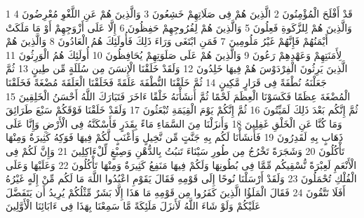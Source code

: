 \documentclass[20pt,a4paper]{article}
\title{}
\author{}
\date{}
\begin{document}
\pagecolor{cl_page}



{\tiny\colorbox{cl_aya}{1}} قَدْ أَفْلَحَ الْمُؤْمِنُونَ
{\tiny\colorbox{cl_aya}{2}} الَّذِينَ هُمْ فِى صَلَاتِهِمْ خَشِعُونَ
{\tiny\colorbox{cl_aya}{3}} وَالَّذِينَ هُمْ عَنِ اللَّغْوِ مُعْرِضُونَ
{\tiny\colorbox{cl_aya}{4}} وَالَّذِينَ هُمْ لِلزَّكَوةِ فَعِلُونَ
{\tiny\colorbox{cl_aya}{5}} وَالَّذِينَ هُمْ لِفُرُوجِهِمْ حَفِظُونَ
{\tiny\colorbox{cl_aya}{6}} إِلَّا عَلَى أَزْوَجِهِمْ أَوْ مَا مَلَكَتْ أَيْمَنُهُمْ فَإِنَّهُمْ غَيْرُ مَلُومِينَ
{\tiny\colorbox{cl_aya}{7}} فَمَنِ ابْتَغَى وَرَاءَ ذَلِكَ فَأُولَئِكَ هُمُ الْعَادُونَ
{\tiny\colorbox{cl_aya}{8}} وَالَّذِينَ هُمْ لِأَمَنَتِهِمْ وَعَهْدِهِمْ رَعُونَ
{\tiny\colorbox{cl_aya}{9}} وَالَّذِينَ هُمْ عَلَى صَلَوَتِهِمْ يُحَافِظُونَ
{\tiny\colorbox{cl_aya}{10}} أُولَئِكَ هُمُ الْوَرِثُونَ
{\tiny\colorbox{cl_aya}{11}} الَّذِينَ يَرِثُونَ الْفِرْدَوْسَ هُمْ فِيهَا خَلِدُونَ
{\tiny\colorbox{cl_aya}{12}} وَلَقَدْ خَلَقْنَا الْإِنسَنَ مِن سُلَلَةٍ مِّن طِينٍ
{\tiny\colorbox{cl_aya}{13}} ثُمَّ جَعَلْنَهُ نُطْفَةً فِى قَرَارٍ مَّكِينٍ
{\tiny\colorbox{cl_aya}{14}} ثُمَّ خَلَقْنَا النُّطْفَةَ عَلَقَةً فَخَلَقْنَا الْعَلَقَةَ مُضْغَةً فَخَلَقْنَا الْمُضْغَةَ عِظَمًا فَكَسَوْنَا الْعِظَمَ لَحْمًا ثُمَّ أَنشَأْنَهُ خَلْقًا ءَاخَرَ فَتَبَارَكَ اللَّهُ أَحْسَنُ الْخَلِقِينَ
{\tiny\colorbox{cl_aya}{15}} ثُمَّ إِنَّكُم بَعْدَ ذَلِكَ لَمَيِّتُونَ
{\tiny\colorbox{cl_aya}{16}} ثُمَّ إِنَّكُمْ يَوْمَ الْقِيَمَةِ تُبْعَثُونَ
{\tiny\colorbox{cl_aya}{17}} وَلَقَدْ خَلَقْنَا فَوْقَكُمْ سَبْعَ طَرَائِقَ وَمَا كُنَّا عَنِ الْخَلْقِ غَفِلِينَ
{\tiny\colorbox{cl_aya}{18}} وَأَنزَلْنَا مِنَ السَّمَاءِ مَاءً بِقَدَرٍ فَأَسْكَنَّهُ فِى الْأَرْضِ وَإِنَّا عَلَى ذَهَابٍ بِهِ لَقَدِرُونَ
{\tiny\colorbox{cl_aya}{19}} فَأَنشَأْنَا لَكُم بِهِ جَنَّتٍ مِّن نَّخِيلٍ وَأَعْنَبٍ لَّكُمْ فِيهَا فَوَكِهُ كَثِيرَةٌ وَمِنْهَا تَأْكُلُونَ
{\tiny\colorbox{cl_aya}{20}} وَشَجَرَةً تَخْرُجُ مِن طُورِ سَيْنَاءَ تَنبُتُ بِالدُّهْنِ وَصِبْغٍ لِّلْءَاكِلِينَ
{\tiny\colorbox{cl_aya}{21}} وَإِنَّ لَكُمْ فِى الْأَنْعَمِ لَعِبْرَةً نُّسْقِيكُم مِّمَّا فِى بُطُونِهَا وَلَكُمْ فِيهَا مَنَفِعُ كَثِيرَةٌ وَمِنْهَا تَأْكُلُونَ
{\tiny\colorbox{cl_aya}{22}} وَعَلَيْهَا وَعَلَى الْفُلْكِ تُحْمَلُونَ
{\tiny\colorbox{cl_aya}{23}} وَلَقَدْ أَرْسَلْنَا نُوحًا إِلَى قَوْمِهِ فَقَالَ يَقَوْمِ اعْبُدُوا اللَّهَ مَا لَكُم مِّنْ إِلَهٍ غَيْرُهُ أَفَلَا تَتَّقُونَ
{\tiny\colorbox{cl_aya}{24}} فَقَالَ الْمَلَؤُا الَّذِينَ كَفَرُوا مِن قَوْمِهِ مَا هَذَا إِلَّا بَشَرٌ مِّثْلُكُمْ يُرِيدُ أَن يَتَفَضَّلَ عَلَيْكُمْ وَلَوْ شَاءَ اللَّهُ لَأَنزَلَ مَلَئِكَةً مَّا سَمِعْنَا بِهَذَا فِى ءَابَائِنَا الْأَوَّلِينَ
\end{document}
